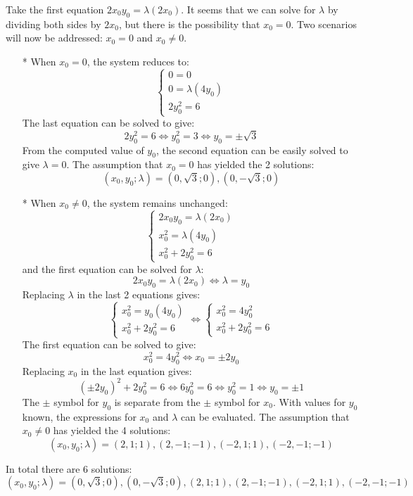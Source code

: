 \documentclass{article}
\begin{document}
\begin{itemize}
Take the first equation \(2x_0 y_0 = \lambda (2x_0)\). It seems that we can solve for \(\lambda\) by dividing both sides by \(2x_0\), but there is the possibility that \(x_0 = 0\). Two scenarios will now be addressed: \(x_0 = 0\) and \(x_0 \neq 0\).  
\begin{itemize}
\item[*] 
When \(x_0 = 0\), the system reduces to:
\[\left\{\begin{array}{c}
0 = 0 \\ 
0 = \lambda (4y_0) \\ 
2y_0^2 = 6
\end{array}\right.\]
The last equation can be solved to give:
\[2y_0^2 = 6 \iff y_0^2 = 3 \iff y_0 = \pm\sqrt{3}\]
From the computed value of \(y_0\), the second equation can be easily solved to give \(\lambda = 0\). The assumption that \(x_0 = 0\) has yielded the 2 solutions:
\[(x_0, y_0; \lambda) = (0, \sqrt{3}; 0), (0, -\sqrt{3}; 0)\]    
\item[*] 
When \(x_0 \neq 0\), the system remains unchanged:
\[\left\{\begin{array}{c}
2x_0 y_0 = \lambda (2x_0) \\ 
x_0^2 = \lambda (4y_0) \\ 
x_0^2 + 2y_0^2 = 6
\end{array}\right.\]
and the first equation can be solved for \(\lambda\): 
\[2x_0 y_0 = \lambda (2x_0) \iff \lambda = y_0\]
Replacing \(\lambda\) in the last 2 equations gives:
\[\left\{\begin{array}{c}
x_0^2 = y_0(4y_0) \\ 
x_0^2 + 2y_0^2 = 6
\end{array}\right. \iff \left\{\begin{array}{c}
x_0^2 = 4y_0^2 \\ 
x_0^2 + 2y_0^2 = 6
\end{array}\right.\]
The first equation can be solved to give:
\[x_0^2 = 4y_0^2 \iff x_0 = \pm 2y_0\]
Replacing \(x_0\) in the last equation gives:
\[(\pm 2y_0)^2 + 2y_0^2 = 6 \iff 6y_0^2 = 6 \iff y_0^2 = 1 \iff y_0 = \pm 1\]
The \(\pm\) symbol for \(y_0\) is separate from the \(\pm\) symbol for \(x_0\). With values for \(y_0\) known, the expressions for \(x_0\) and \(\lambda\) can be evaluated. The assumption that \(x_0 \neq 0\) has yielded the 4 solutions:
\[(x_0, y_0; \lambda) = (2, 1; 1), (2, -1; -1), (-2, 1; 1), (-2, -1; -1)\]
\end{itemize}
In total there are 6 solutions:
\[(x_0, y_0; \lambda) = (0, \sqrt{3}; 0), (0, -\sqrt{3}; 0), (2, 1; 1), (2, -1; -1), (-2, 1; 1), (-2, -1; -1)\] 


\end{itemize}
\end{document}
